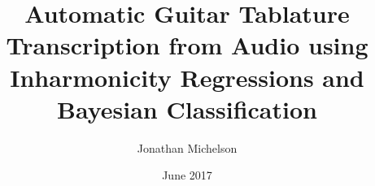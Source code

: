 \documentclass[12pt]{cmuthesis}
\begin{document}
 
\frontmatter

\pagestyle{empty}

\title{ %
{\bf Automatic Guitar Tablature Transcription from Audio using Inharmonicity Regressions and Bayesian Classification}}
\author{Jonathan Michelson}
\date{June 2017}
\trnumber{}


\support{}
\disclaimer{}



\maketitle


\pagestyle{plain} %

\end{document}
